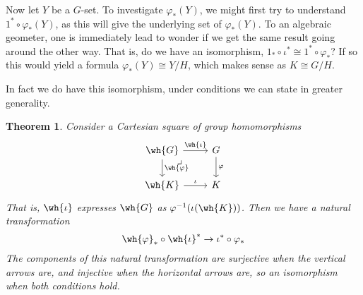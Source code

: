 \documentclass[12nt]{article}
\theoremstyle{plain}
\newtheorem{theorem}{Theorem}
\begin{document}
Now let $Y$ be a $G$-set. To investigate $\varphi_*(Y)$, we might first try to understand $1^* \circ \varphi_*(Y)$, as this will give the underlying set of $\varphi_*(Y)$. To an algebraic geometer, one is immediately lead to wonder if we get the same result going around the other way. That is, do we have an isomorphism, $1_* \circ \iota^* \cong 1^* \circ \varphi_*$? If so this would yield a formula $\varphi_*(Y) \cong Y/H$, which makes sense as $K \cong G/H$. 

 In fact we do have this isomorphism, under conditions we can state in greater generality.
\begin{theorem}
	Consider a Cartesian square of group homomorphisms
	\[
		\begin{tikzcd}
			\wh{G} \ar[r, "\wh{\iota}"] \ar[d, "\wh{\varphi}"] \ar[dr, phantom, very near start, "\lrcorner"] & G \ar[d, "\varphi"] \\
		\wh{K} \ar[r, "\iota"] & K
		\end{tikzcd}
	\]
	 That is, $\wh{\iota}$ expresses $\wh{G}$ as $\varphi^{-1}(\iota(\wh{K}))$. Then we have a natural transformation 
	\[
		\wh{\varphi}_* \circ \wh{\iota}^* \to \iota^* \circ \varphi_*
	\]
	The components of this natural transformation are surjective when the vertical arrows are, and injective when the horizontal arrows are, so an isomorphism when both conditions hold.
\end{theorem}
\end{document}
